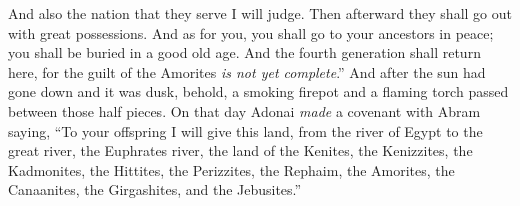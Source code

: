 \begin{biblechapter}
\verse And also the nation that they serve I will judge. Then afterward they shall go out with great possessions.
\verse And as for you, you shall go to your ancestors in peace; you shall be buried in a good old age.
\verse And the fourth generation shall return here, for the guilt of the Amorites \textit{is not yet complete}.”
\verse And after the sun had gone down and it was dusk, behold, a smoking firepot and a flaming torch passed between those half pieces.
\verse On that day Adonai \textit{made} a covenant with Abram saying, “To your offspring I will give this land, from the river of Egypt to the great river, the Euphrates river,
\verse the land of the Kenites, the Kenizzites, the Kadmonites,
\verse the Hittites, the Perizzites, the Rephaim,
\verse the Amorites, the Canaanites, the Girgashites, and the Jebusites.”
\end{biblechapter}

